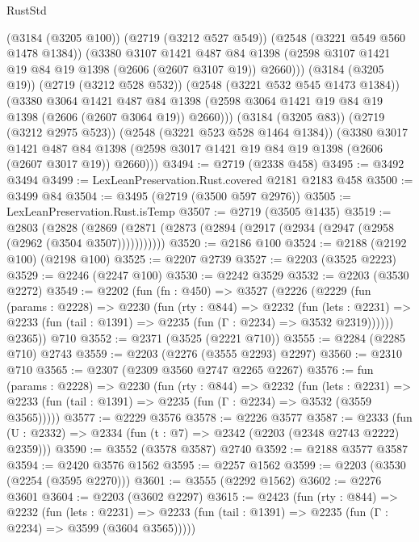 \begin{lexlean}{RustStd}
\begin{coremodule}
          (@3184 (@3205 @100))
          (@2719 (@3212 @527 @549))
          (@2548 (@3221 @549 @560 @1478 @1384))
          (@3380
            @3107
            @1421
            @487
            @84
            @1398
            (@2598 @3107 @1421 @19 @84 @19 @1398 (@2606 (@2607 @3107 @19)) @2660)))
        (@3184 (@3205 @19))
        (@2719 (@3212 @528 @532))
        (@2548 (@3221 @532 @545 @1473 @1384))
        (@3380
          @3064
          @1421
          @487
          @84
          @1398
          (@2598 @3064 @1421 @19 @84 @19 @1398 (@2606 (@2607 @3064 @19)) @2660)))
      (@3184 (@3205 @83))
      (@2719 (@3212 @2975 @523))
      (@2548 (@3221 @523 @528 @1464 @1384))
      (@3380
        @3017
        @1421
        @487
        @84
        @1398
        (@2598 @3017 @1421 @19 @84 @19 @1398 (@2606 (@2607 @3017 @19)) @2660)))
@3494 := @2719 (@2338 @458)
@3495 := @3492 @3494
@3499 := LexLeanPreservation.Rust.covered @2181 @2183 @458
@3500 := @3499 @84
@3504 := @3495 (@2719 (@3500 @597 @2976))
@3505 := LexLeanPreservation.Rust.isTemp
@3507 := @2719 (@3505 @1435)
@3519 := @2803
    (@2828 (@2869 (@2871 (@2873 (@2894 (@2917 (@2934 (@2947 (@2958 (@2962 (@3504 @3507)))))))))))
@3520 := @2186 @100
@3524 := @2188 (@2192 @100) (@2198 @100)
@3525 := @2207 @2739
@3527 := @2203 (@3525 @2223)
@3529 := @2246 (@2247 @100)
@3530 := @2242 @3529
@3532 := @2203 (@3530 @2272)
@3549 := @2202
    (fun (fn : @450) =>
    @3527
      (@2226
        (@2229
          (fun (params : @2228) =>
          @2230
            (fun (rty : @844) =>
            @2232
              (fun (lets : @2231) =>
              @2233 (fun (tail : @1391) => @2235 (fun (Γ : @2234) => @3532 @2319))))))
        @2365))
    @710
@3552 := @2371 (@3525 (@2221 @710))
@3555 := @2284 (@2285 @710) @2743
@3559 := @2203 (@2276 (@3555 @2293) @2297)
@3560 := @2310 @710
@3565 := @2307 (@2309 @3560 @2747 @2265 @2267)
@3576 := fun (params : @2228) =>
  @2230
    (fun (rty : @844) =>
    @2232
      (fun (lets : @2231) =>
      @2233 (fun (tail : @1391) => @2235 (fun (Γ : @2234) => @3532 (@3559 @3565)))))
@3577 := @2229 @3576
@3578 := @2226 @3577
@3587 := @2333 (fun (U : @2332) => @2334 (fun (t : @7) => @2342 (@2203 (@2348 @2743 @2222) @2359)))
@3590 := @3552 (@3578 @3587) @2740
@3592 := @2188 @3577 @3587
@3594 := @2420 @3576 @1562
@3595 := @2257 @1562
@3599 := @2203 (@3530 (@2254 (@3595 @2270)))
@3601 := @3555 (@2292 @1562)
@3602 := @2276 @3601
@3604 := @2203 (@3602 @2297)
@3615 := @2423
    (fun (rty : @844) =>
    @2232
      (fun (lets : @2231) =>
      @2233 (fun (tail : @1391) => @2235 (fun (Γ : @2234) => @3599 (@3604 @3565)))))

\end{coremodule}
\end{lexlean}
